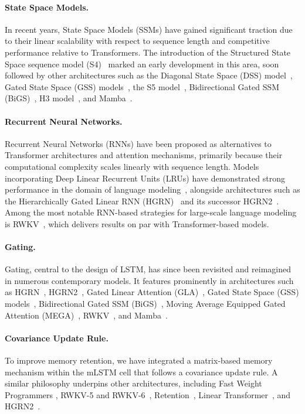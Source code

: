 \paragraph{State Space Models.} In recent years, State Space Models (SSMs) have gained significant traction due to their linear scalability with respect to sequence length and competitive performance relative to Transformers. The introduction of the Structured State Space sequence model (S4)~\citep{Gu:21} marked an early development in this area, soon followed by other architectures such as the Diagonal State Space (DSS) model~\citep{Gupta:22}, Gated State Space (GSS) models~\citep{Mehta:22}, the S5 model~\citep{Smith:22}, Bidirectional Gated SSM (BiGS)~\citep{Wang:22}, H3 model~\citep{Fu:23}, and Mamba~\citep{Gu:24arxiv}.

\paragraph{Recurrent Neural Networks.} Recurrent Neural Networks (RNNs) have been proposed as alternatives to Transformer architectures and attention mechanisms, primarily because their computational complexity scales linearly with sequence length. Models incorporating Deep Linear Recurrent Units (LRUs) have demonstrated strong performance in the domain of language modeling~\citep{Orvieto:23, De:24arxiv}, alongside architectures such as the Hierarchically Gated Linear RNN (HGRN)~\citep{Qin:23} and its successor HGRN2~\citep{Qin:24arxiv}. Among the most notable RNN-based strategies for large-scale language modeling is RWKV~\citep{Peng:23arxivshort, Peng:24arxivshort}, which delivers results on par with Transformer-based models.

\paragraph{Gating.}
Gating, central to the design of LSTM, has since been revisited and reimagined in numerous contemporary models. It features prominently in architectures such as HGRN~\citep{Qin:23}, HGRN2~\citep{Qin:24arxiv}, Gated Linear Attention (GLA)~\citep{Yang:23arxiv}, Gated State Space (GSS) models~\citep{Mehta:22}, Bidirectional Gated SSM (BiGS)~\citep{Wang:22}, Moving Average Equipped Gated Attention (MEGA)~\citep{Ma:22}, RWKV~\citep{Peng:23arxivshort}, and Mamba~\citep{Gu:24arxiv}.

\paragraph{Covariance Update Rule.}
To improve memory retention, we have integrated a matrix-based memory mechanism within the mLSTM cell that follows a covariance update rule. A similar philosophy underpins other architectures, including Fast Weight Programmers \citep{Schmidhuber:92ncfastweights,Schlag:21}, RWKV-5 and RWKV-6~\citep{Peng:24arxivshort}, Retention~\citep{Sun:23arxiv}, Linear Transformer~\citep{Katharopoulos:20}, and HGRN2~\citep{Qin:24arxiv}.

